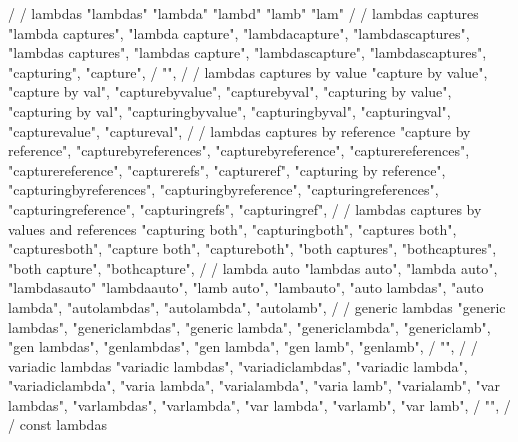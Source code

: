         /
        / lambdas
        "lambdas"
        "lambda"
        "lambd"
        "lamb"
        "lam"
        /
        / lambdas captures
        "lambda captures",  
        "lambda capture",  
        "lambdacapture",  
        "lambdascaptures",  
        "lambdas captures",  
        "lambdas capture",  
        "lambdascapture",  
        "lambdascaptures",  
        "capturing",  
        "capture",  
        / {"", 
        /
        / lambdas captures by value
        "capture by value",  
        "capture by val",  
        "capturebyvalue",  
        "capturebyval",  
        "capturing by value",  
        "capturing by val",  
        "capturingbyvalue",  
        "capturingbyval",  
        "capturingval",  
        "capturevalue",  
        "captureval",  
        /
        / lambdas captures by reference 
        "capture by reference",  
        "capturebyreferences",  
        "capturebyreference",  
        "capturereferences",  
        "capturereference",  
        "capturerefs",  
        "captureref",  
        "capturing by reference",  
        "capturingbyreferences",  
        "capturingbyreference",  
        "capturingreferences",  
        "capturingreference",  
        "capturingrefs",  
        "capturingref",  
        /
        / lambdas captures by values and references 
        "capturing both",  
        "capturingboth",  
        "captures both",  
        "capturesboth",  
        "capture both",  
        "captureboth",  
        "both captures",  
        "bothcaptures",  
        "both capture",  
        "bothcapture",  
        /
        / lambda auto
        "lambdas auto",
        "lambda auto",
        "lambdasauto"
        "lambdaauto",
        "lamb auto",
        "lambauto",
        "auto lambdas",
        "auto lambda",
        "autolambdas",
        "autolambda",
        "autolamb",
        /
        / generic lambdas
        "generic lambdas",  
        "genericlambdas",  
        "generic lambda",  
        "genericlambda",  
        "genericlamb",  
        "gen lambdas",  
        "genlambdas",  
        "gen lambda",  
        "gen lamb",  
        "genlamb",  
        / {"", 
        /
        / variadic lambdas 
        "variadic lambdas",  
        "variadiclambdas",  
        "variadic lambda",  
        "variadiclambda",  
        "varia lambda",  
        "varialambda",  
        "varia lamb",  
        "varialamb",  
        "var lambdas",  
        "varlambdas",  
        "varlambda",  
        "var lambda",  
        "varlamb",  
        "var lamb",  
        / {"", 
        /
        / const lambdas 
}}}
